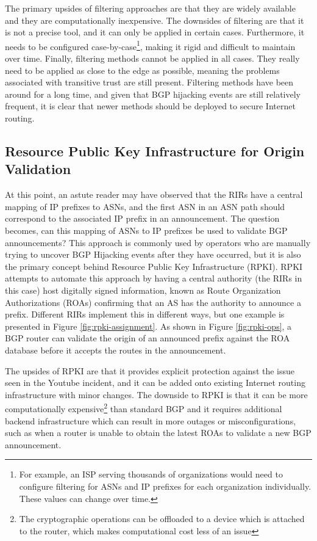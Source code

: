 \documentclass[conference]{IEEEtran}
\begin{document}
The primary upsides of filtering approaches are that they are widely available and they are computationally inexpensive.  The downsides of filtering are that it is not a precise tool, and it can only be applied in certain cases.  Furthermore, it needs to be configured case-by-case\footnote{For example, an ISP serving thousands of organizations would need to configure filtering for ASNs and IP prefixes for each organization individually.  These values can change over time.}, making it rigid and difficult to maintain over time.  Finally, filtering methods cannot be applied in all cases.  They really need to be applied as close to the edge as possible, meaning the problems associated with transitive trust are still present.  Filtering methods have been around for a long time, and given that BGP hijacking events are still relatively frequent, it is clear that newer methods should be deployed to secure Internet routing.

\subsection{Resource Public Key Infrastructure for Origin Validation}
At this point, an astute reader may have observed that the RIRs have a central mapping of IP prefixes to ASNs, and the first ASN in an ASN path should correspond to the associated IP prefix in an announcement.  The question becomes, can this mapping of ASNs to IP prefixes be used to validate BGP announcements?  This approach is commonly used by operators who are manually trying to uncover BGP Hijacking events after they have occurred, but it is also the primary concept behind Resource Public Key Infrastructure (RPKI).  RPKI attempts to automate this approach by having a central authority (the RIRs in this case) host digitally signed information, known as Route Organization Authorizations (ROAs) confirming that an AS has the authority to announce a prefix.  Different RIRs implement this in different ways, but one example is presented in Figure \ref{fig:rpki-assignment}.  As shown in Figure \ref{fig:rpki-ops}, a BGP router can validate the origin of an announced prefix against the ROA database before it accepts the routes in the announcement.

The upsides of RPKI are that it provides explicit protection against the issue seen in the Youtube incident, and it can be added onto existing Internet routing infrastructure with minor changes.  The downside to RPKI is that it can be more computationally expensive\footnote{The cryptographic operations can be offloaded to a device which is attached to the router, which makes computational cost less of an issue} than standard BGP and it requires additional backend infrastructure which can result in more outages or misconfigurations, such as when a router is unable to obtain the latest ROAs to validate a new BGP announcement.
\end{document}
